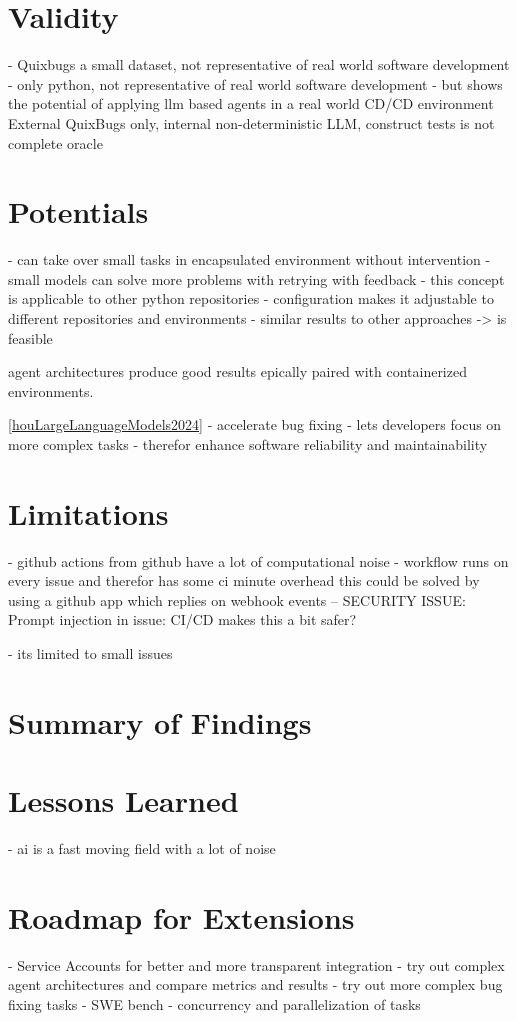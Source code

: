 \section{Validity}

- Quixbugs a small dataset, not representative of real world software development
- only python, not representative of real world software development
- but shows the potential of applying llm based agents in a real world CD/CD environment
External QuixBugs only, internal non-deterministic LLM, construct tests is not complete oracle

\section{Potentials}
- can take over small tasks in encapsulated environment without intervention
- small models can solve more problems with retrying with feedback
- this concept is applicable to other python repositories
- configuration makes it adjustable to different repositories and environments
- similar results to other approaches -> is feasible


agent architectures produce good results epically paired with containerized environments. \cite{puvvadiCodingAgentsComprehensive2025}

\ref{houLargeLanguageModels2024}
- accelerate bug fixing
- lets developers focus on more complex tasks
- therefor enhance software reliability and maintainability

\section{Limitations}
- github actions from github have a lot of computational noise
- workflow runs on every issue and therefor has some ci minute overhead this could be solved by using a github app which replies on webhook events
-- SECURITY ISSUE: Prompt injection in issue: CI/CD makes this a bit safer?

- its limited to small issues

\section{Summary of Findings}

\section{Lessons Learned}
- ai is a fast moving field with a lot of noise


\section{Roadmap for Extensions}
- Service Accounts for better and more transparent integration
- try out complex agent architectures and compare metrics and results
- try out more complex bug fixing tasks - SWE bench
- concurrency and parallelization of tasks